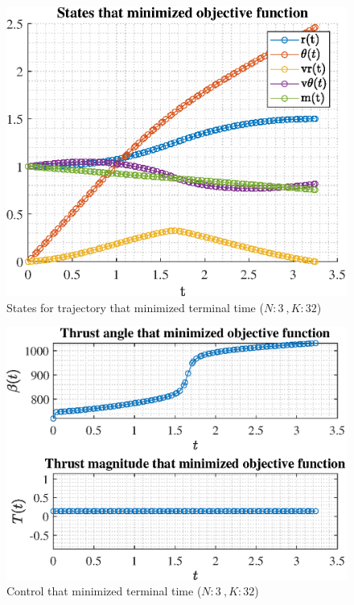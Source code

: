 \documentclass[]{article}
\begin{document}
\begin{figure}
	\centering
	\includegraphics[scale=0.75]{states_N3_K32_C2_tf.eps}
	\caption{States for trajectory that minimized terminal time (\(N:3\ , K:32\))}
	\label{fig:states_N3_K32_C2_tf}
\end{figure}
\begin{figure}
	\centering
	\includegraphics[scale=0.75]{control_N3_K32_C2_tf.eps}
	\caption{Control that minimized terminal time (\(N:3\ , K:32\))}
	\label{fig:control_N3_K32_C2_tf}
\end{figure}
\end{document}
